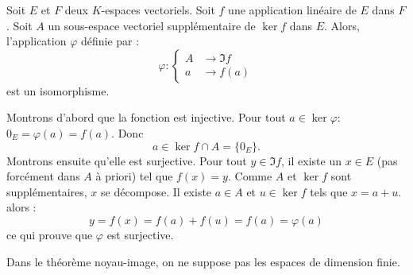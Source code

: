 \begin{thmn}
 Soit $E$ et $F$ deux $K$-espaces vectoriels. Soit $f$ une application linéaire de $E$ dans $F$. Soit $A$ un sous-espace vectoriel supplémentaire de $\ker f$ dans $E$. Alors, l'application $\varphi$ définie par :
\begin{displaymath}
 \varphi : \left\lbrace 
\begin{aligned}
 A &\rightarrow \Im f \\
 a &\rightarrow f(a)
\end{aligned}
\right. 
\end{displaymath}
est un isomorphisme.
\end{thmn}
\begin{demo}
 Montrons d'abord que la fonction est injective. Pour tout $a\in \ker \varphi$: $0_E=\varphi(a)=f(a)$. Donc 
\begin{displaymath}
a\in \ker f\cap A =\{0_E\}.
\end{displaymath}
Montrons ensuite qu'elle est surjective. Pour tout $y\in\Im f$, il existe un $x\in E$ (pas forcément dans $A$ à priori) tel que $f(x)=y$. Comme $A$ et $\ker f$ sont supplémentaires, $x$ se décompose. Il existe $a\in A$ et $u\in \ker f$ tels que $x=a+u$. alors :
\begin{displaymath}
 y=f(x)=f(a)+f(u)=f(a)=\varphi(a)
\end{displaymath}
ce qui prouve que $\varphi$ est surjective.
\end{demo}
\begin{rem}
 Dans le théorème noyau-image, on ne suppose pas les espaces de dimension finie. 
\end{rem}

